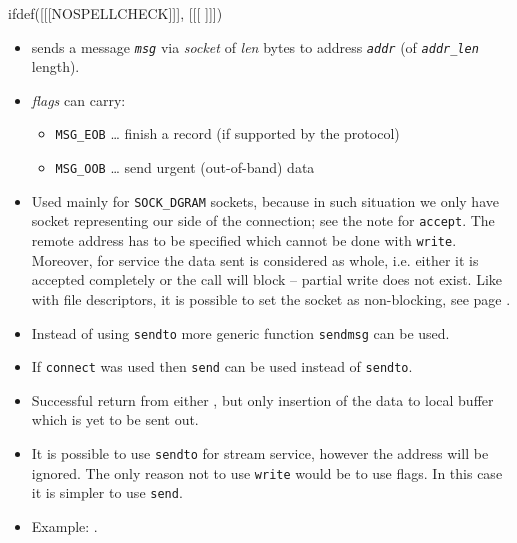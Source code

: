 \begin{slide}
ifdef([[[NOSPELLCHECK]]], [[[
]]])
\begin{itemize}
\item sends a message \emph{\texttt{msg}} via \emph{socket} of \emph{l{}en}
bytes to address \emph{\texttt{addr}} (of \emph{\texttt{addr\_len}} length). 
\item \emph{flags} can carry:
    \begin{itemize}
    \item \texttt{MSG\_EOB} \dots{} finish a record (if supported by the
    protocol)
    \item \texttt{MSG\_OOB} \dots{} send urgent (out-of-band) data
    \end{itemize}
\end{itemize}
\end{slide}

\begin{itemize}
\item Used mainly for \texttt{SOCK\_DGRAM} sockets, because in such situation
we only have socket representing our side of the connection; see the note
for \texttt{accept}. The remote address has to be specified which cannot be
done with \texttt{write}. Moreover, for  service the data sent
is considered as whole, i.e. either it is accepted completely or the call
will block -- partial write does not exist. Like with file descriptors, it is
possible to set the socket as non-blocking, see page \pageref{FCNTL}.
\item Instead of using \texttt{sendto} more generic function \texttt{sendmsg}
can be used.
\item If \texttt{connect} was used then \texttt{send} can be used instead of
\texttt{sendto}.
\item Successful return from either , but only insertion of the data to local buffer
which is yet to be sent out.
\item It is possible to use \texttt{sendto} for stream service, however the
address will be ignored. The only reason not to use \texttt{write} would be to
use flags. In this case it is simpler to use \texttt{send}.
\item Example:\label{UDP_CLIENT_C} .
\end{itemize}

